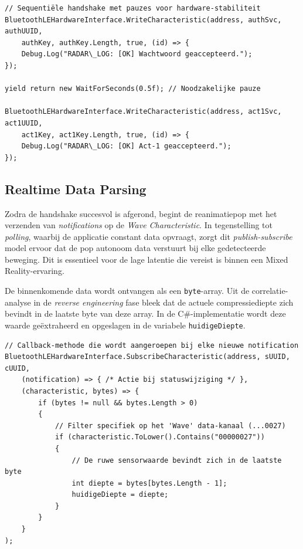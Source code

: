 \begin{listing}[htbp]
\begin{verbatim}
// Sequentiële handshake met pauzes voor hardware-stabiliteit
BluetoothLEHardwareInterface.WriteCharacteristic(address, authSvc, authUUID, 
    authKey, authKey.Length, true, (id) => { 
    Debug.Log("RADAR\_LOG: [OK] Wachtwoord geaccepteerd.");
});

yield return new WaitForSeconds(0.5f); // Noodzakelijke pauze

BluetoothLEHardwareInterface.WriteCharacteristic(address, act1Svc, act1UUID, 
    act1Key, act1Key.Length, true, (id) => { 
    Debug.Log("RADAR\_LOG: [OK] Act-1 geaccepteerd.");
});
\end{verbatim}
\caption{C\#-implementatie van de sequentiële BLE-handshake.}
\label{lst:ble_handshake}
\end{listing}

\subsection{Realtime Data Parsing}
Zodra de handshake succesvol is afgerond, begint de reanimatiepop met het verzenden van \textit{notifications} op de \textit{Wave Characteristic}. In tegenstelling 
tot \textit{polling}, waarbij de applicatie constant data opvraagt, zorgt dit \textit{publish-subscribe} model ervoor dat de pop autonoom data verstuurt 
bij elke gedetecteerde beweging. Dit is essentieel voor de lage latentie die vereist is binnen een Mixed Reality-ervaring.

De binnenkomende data wordt ontvangen als een \texttt{byte}-array. Uit de correlatie-analyse in de \textit{reverse engineering} fase bleek dat de actuele 
compressiediepte zich bevindt in de laatste byte van deze array. In de C\#-implementatie wordt deze waarde geëxtraheerd en opgeslagen in de variabele 
\texttt{huidigeDiepte}.

\begin{listing}[htbp]
\begin{verbatim}
// Callback-methode die wordt aangeroepen bij elke nieuwe notification
BluetoothLEHardwareInterface.SubscribeCharacteristic(address, sUUID, cUUID, 
    (notification) => { /* Actie bij statuswijziging */ },
    (characteristic, bytes) => {
        if (bytes != null && bytes.Length > 0)
        {
            // Filter specifiek op het 'Wave' data-kanaal (...0027)
            if (characteristic.ToLower().Contains("00000027"))
            {
                // De ruwe sensorwaarde bevindt zich in de laatste byte
                int diepte = bytes[bytes.Length - 1];
                huidigeDiepte = diepte; 
            }
        }
    }
);
\end{verbatim}
\caption{Realtime parsing en filtering van de binnengekomen BLE-sensordata.}
\label{lst:realtime_data_parsing}
\end{listing}

